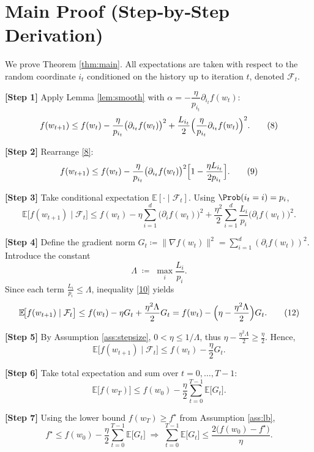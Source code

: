 \documentclass{article}
\newcommand{\E}{\mathbb{E}}
\newcommand{\grad}{\nabla}
\begin{document}
\section*{Main Proof (Step‑by‑Step Derivation)}
We prove Theorem \ref{thm:main}. All expectations are taken with respect to
the random coordinate $i_{t}$ conditioned on the history up to iteration $t$,
denoted $\mathcal F_{t}$.

\noindent\textbf{[Step 1]} Apply Lemma \ref{lem:smooth} with
$\alpha=-\dfrac{\eta}{p_{i_{t}}}\partial_{i_{t}}f(w_{t})$:
\[
f(w_{t+1})\le f(w_{t})
-\frac{\eta}{p_{i_{t}}}\bigl(\partial_{i_{t}}f(w_{t})\bigr)^{2}
+\frac{L_{i_{t}}}{2}\Bigl(\frac{\eta}{p_{i_{t}}}\partial_{i_{t}}f(w_{t})\Bigr)^{2}.
\tag{8}
\]

\noindent\textbf{[Step 2]} Rearrange \eqref{8}:
\[
f(w_{t+1})\le f(w_{t})
-\frac{\eta}{p_{i_{t}}}\bigl(\partial_{i_{t}}f(w_{t})\bigr)^{2}
\Bigl[1-\frac{\eta L_{i_{t}}}{2p_{i_{t}}}\Bigr].
\tag{9}
\]

\noindent\textbf{[Step 3]} Take conditional expectation $\E[\cdot\mid\mathcal F_{t}]$.
Using $\Prob(i_{t}=i)=p_{i}$,
\[
\E\!\bigl[f(w_{t+1})\mid\mathcal F_{t}\bigr]
\le f(w_{t})-\eta\sum_{i=1}^{d}
\bigl(\partial_{i}f(w_{t})\bigr)^{2}
+\frac{\eta^{2}}{2}\sum_{i=1}^{d}\frac{L_{i}}{p_{i}}
\bigl(\partial_{i}f(w_{t})\bigr)^{2}.
\tag{10}
\]

\noindent\textbf{[Step 4]} Define the gradient norm
$G_{t}\coloneqq\|\grad f(w_{t})\|^{2}
= \sum_{i=1}^{d}(\partial_{i}f(w_{t}))^{2}$.
Introduce the constant
\[
\Lambda\;\coloneqq\;\max_{i}\frac{L_{i}}{p_{i}}.
\tag{11}
\]
Since each term $\frac{L_{i}}{p_{i}}\le\Lambda$, inequality \eqref{10} yields
\[
\E\!\bigl[f(w_{t+1})\mid\mathcal F_{t}\bigr]
\le f(w_{t})-\eta G_{t}
+\frac{\eta^{2}\Lambda}{2}G_{t}
= f(w_{t})-\Bigl(\eta-\frac{\eta^{2}\Lambda}{2}\Bigr)G_{t}.
\tag{12}
\]

\noindent\textbf{[Step 5]} By Assumption \ref{ass:stepsize},
$0<\eta\le 1/\Lambda$, thus $\eta-\frac{\eta^{2}\Lambda}{2}\ge\frac{\eta}{2}$.
Hence,
\[
\E\!\bigl[f(w_{t+1})\mid\mathcal F_{t}\bigr]
\le f(w_{t})-\frac{\eta}{2}G_{t}.
\tag{13}
\]

\noindent\textbf{[Step 6]} Take total expectation and sum over $t=0,\dots ,T-1$:
\[
\E\!\bigl[f(w_{T})\bigr]
\le f(w_{0})-\frac{\eta}{2}\sum_{t=0}^{T-1}\E\!\bigl[G_{t}\bigr].
\tag{14}
\]

\noindent\textbf{[Step 7]} Using the lower bound $f(w_{T})\ge f^{\star}$ from
Assumption \ref{ass:lb},
\[
f^{\star}\le f(w_{0})-\frac{\eta}{2}\sum_{t=0}^{T-1}\E\!\bigl[G_{t}\bigr]
\;\Longrightarrow\;
\sum_{t=0}^{T-1}\E\!\bigl[G_{t}\bigr]
\le\frac{2\bigl(f(w_{0})-f^{\star}\bigr)}{\eta}.
\tag{15}
\]
\end{document}
